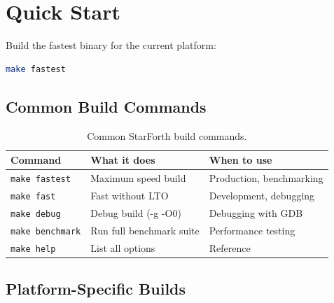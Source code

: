 
\section{Quick Start}
\label{sec:quickstart}

Build the fastest binary for the current platform:

\begin{lstlisting}[language=bash]
make fastest
\end{lstlisting}

\subsection{Common Build Commands}
\label{sec:quickstart-commands}

\begin{table}[h]
  \centering
  \begin{tabular}{lll}
    \toprule
    Command              & What it does              & When to use \\
    \midrule
    \texttt{make fastest}   & Maximum speed build    & Production, benchmarking \\
    \texttt{make fast}      & Fast without LTO       & Development, debugging \\
    \texttt{make debug}     & Debug build (-g -O0)   & Debugging with GDB \\
    \texttt{make benchmark} & Run full benchmark suite & Performance testing \\
    \texttt{make help}      & List all options       & Reference \\
    \bottomrule
  \end{tabular}
  \caption{Common StarForth build commands.}
  \label{tab:quickstart-commands}
\end{table}

\subsection{Platform-Specific Builds}
\label{sec:quickstart-platforms}

